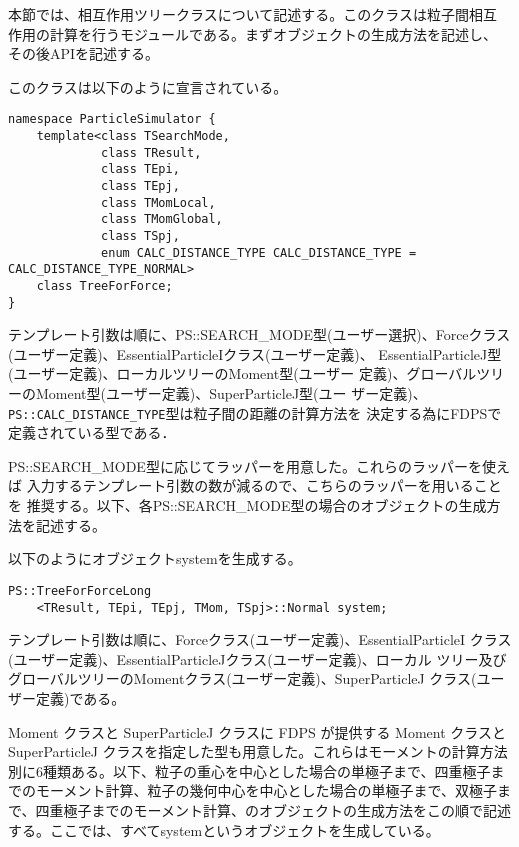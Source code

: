 本節では、相互作用ツリークラスについて記述する。このクラスは粒子間相互
作用の計算を行うモジュールである。まずオブジェクトの生成方法を記述し、
その後APIを記述する。

\label{sec:module_standard_treeforce_object}

このクラスは以下のように宣言されている。
\begin{lstlisting}[caption=TreeForForce0]
namespace ParticleSimulator {
    template<class TSearchMode,
             class TResult,
             class TEpi,
             class TEpj,
             class TMomLocal,
             class TMomGlobal,
             class TSpj,
             enum CALC_DISTANCE_TYPE CALC_DISTANCE_TYPE = CALC_DISTANCE_TYPE_NORMAL>
    class TreeForForce;
}
\end{lstlisting}

テンプレート引数は順に、PS::SEARCH\_MODE型(ユーザー選択)、Forceクラス
(ユーザー定義)、EssentialParticleIクラス(ユーザー定義)、
EssentialParticleJ型(ユーザー定義)、ローカルツリーのMoment型(ユーザー
定義)、グローバルツリーのMoment型(ユーザー定義)、SuperParticleJ型(ユー
ザー定義)、{\tt PS::CALC\_DISTANCE\_TYPE}型は粒子間の距離の計算方法を
決定する為にFDPSで定義されている型である．

PS::SEARCH\_MODE型に応じてラッパーを用意した。これらのラッパーを使えば
入力するテンプレート引数の数が減るので、こちらのラッパーを用いることを
推奨する。以下、各PS::SEARCH\_MODE型の場合のオブジェクトの生成方法を記述する。

\label{sec:module_treeforce_standard_search_mode_long}

以下のようにオブジェクトsystemを生成する。
\begin{screen}
\begin{verbatim}
PS::TreeForForceLong
    <TResult, TEpi, TEpj, TMom, TSpj>::Normal system;
\end{verbatim}
\end{screen}
テンプレート引数は順に、Forceクラス(ユーザー定義)、EssentialParticleI
クラス(ユーザー定義)、EssentialParticleJクラス(ユーザー定義)、ローカル
ツリー及びグローバルツリーのMomentクラス(ユーザー定義)、SuperParticleJ
クラス(ユーザー定義)である。

Moment クラスと SuperParticleJ クラスに FDPS が提供する Moment クラスと SuperParticleJ クラスを指定した型も用意した。これらはモーメントの計算方法別に6種類ある。以下、粒子の重心を中心とした場合の単極子まで、四重極子までのモーメント計算、粒子の幾何中心を中心とした場合の単極子まで、双極子まで、四重極子までのモーメント計算、のオブジェクトの生成方法をこの順で記述する。ここでは、すべてsystemというオブジェクトを生成している。

